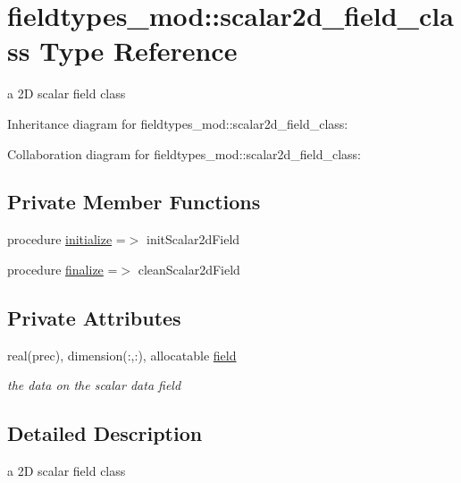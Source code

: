 \hypertarget{structfieldtypes__mod_1_1scalar2d__field__class}{}\section{fieldtypes\+\_\+mod\+:\+:scalar2d\+\_\+field\+\_\+class Type Reference}
\label{structfieldtypes__mod_1_1scalar2d__field__class}


a 2D scalar field class  




Inheritance diagram for fieldtypes\+\_\+mod\+:\+:scalar2d\+\_\+field\+\_\+class\+:


Collaboration diagram for fieldtypes\+\_\+mod\+:\+:scalar2d\+\_\+field\+\_\+class\+:
\subsection*{Private Member Functions}
\begin{DoxyCompactItemize}
\item 
procedure \mbox{\hyperlink{structfieldtypes__mod_1_1scalar2d__field__class_ad351be43d28cb9fc0a7cbb8874315276}{initialize}} =$>$ init\+Scalar2d\+Field
\item 
procedure \mbox{\hyperlink{structfieldtypes__mod_1_1scalar2d__field__class_ae4b29ecca102f1ad00b9a3aabd5effc3}{finalize}} =$>$ clean\+Scalar2d\+Field
\end{DoxyCompactItemize}
\subsection*{Private Attributes}
\begin{DoxyCompactItemize}
\item 
real(prec), dimension(\+:,\+:), allocatable \mbox{\hyperlink{structfieldtypes__mod_1_1scalar2d__field__class_a4c3879389ef1af4e218544a5acc3215d}{field}}
\begin{DoxyCompactList}\small\item\em the data on the scalar data field \end{DoxyCompactList}\end{DoxyCompactItemize}


\subsection{Detailed Description}
a 2D scalar field class 

